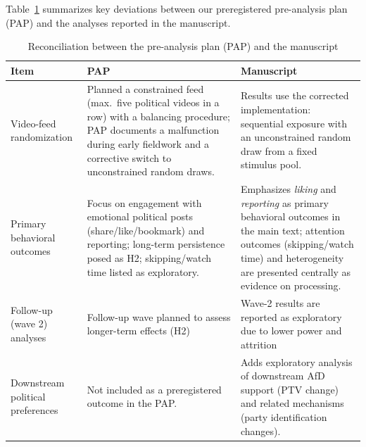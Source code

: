 \documentclass[12pt]{article}
\begin{document}
Table~\ref{tab:reconciliation} summarizes key deviations between our preregistered pre-analysis plan (PAP) and the analyses reported in the manuscript.

\begin{table}[ht]
\centering
\caption{Reconciliation between the pre-analysis plan (PAP) and the manuscript}
\label{tab:reconciliation}
\small
\begin{tabular}{p{3.2cm} p{5.8cm} p{5.8cm}}
\toprule
\textbf{Item} & \textbf{PAP} & \textbf{Manuscript} \\
\midrule
Video-feed randomization & Planned a constrained feed (max.\ five political videos in a row) with a balancing procedure; PAP documents a malfunction during early fieldwork and a corrective switch to unconstrained random draws. & Results use the corrected implementation: sequential exposure with an unconstrained random draw from a fixed stimulus pool. \\
Primary behavioral outcomes & Focus on engagement with emotional political posts (share/like/bookmark) and reporting; long-term persistence posed as H2; skipping/watch time listed as exploratory.  & Emphasizes \textit{liking} and \textit{reporting} as primary behavioral outcomes in the main text; attention outcomes (skipping/watch time) and heterogeneity are presented centrally as evidence on processing. \\
Follow-up (wave 2) analyses & Follow-up wave planned to assess longer-term effects (H2)  & Wave-2 results are reported as exploratory due to lower power and attrition  \\
Downstream political preferences & Not included as a preregistered outcome in the PAP.  & Adds exploratory analysis of downstream AfD support (PTV change) and related mechanisms (party identification changes). \\
\bottomrule
\end{tabular}
\end{table}
\end{document}
